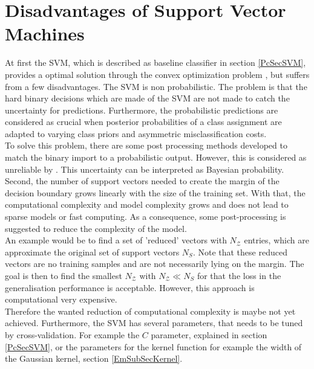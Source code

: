 \section{Disadvantages of Support Vector Machines}\label{PcSecIdea}
At first the \acs{SVM}, which is described as baseline classifier in section \ref{PcSecSVM}, provides a optimal solution through the convex optimization problem \cite[p. 325]{Bishop.2009}, but suffers from a few disadvantages.\newline
The \acs{SVM} is non probabilistic.
The problem is that the hard binary decisions which are made of the \acs{SVM} are not made to catch the uncertainty for predictions.
Furthermore, the probabilistic predictions are considered as crucial when posterior probabilities of a class assignment are adapted to varying class priors and asymmetric misclassification costs.\cite[p. 239-240]{Tipping.2001}\\
To solve this problem, there are some post processing methods developed to match the binary import to a probabilistic output.
However, this is considered as unreliable by \cite[p. 239-240]{Tipping.2001}. 
This uncertainty can be interpreted as Bayesian probability.\cite[p. 21]{Bishop.2009}\newline 
Second, the number of support vectors needed to create the margin of the decision boundary grows linearly with the size of the training set.
With that, the computational complexity and model complexity grows and does not lead to sparse models or fast computing.
As a consequence, some post-processing is suggested to reduce the complexity of the model.\cite{Chen.2009}\\
An example would be to find a set of 'reduced' vectors with $N_\mathcal{Z}$ entries, which are approximate the original set of support vectors $N_S$.
Note that these reduced vectors are no training samples and are not necessarily lying on the margin.
The goal is then to find the smallest $N_\mathcal{Z}$ with $N_\mathcal{Z} \ll N_S$ for that the loss in the generalisation performance is acceptable.
However, this approach is computational very expensive.\cite{Burges.1997}\\
Therefore the wanted reduction of computational complexity is maybe not yet achieved.\newline
Furthermore, the \ac{SVM} has several parameters, that needs to be tuned by cross-validation.
For example the $C$ parameter, explained in section \ref{PcSecSVM}, or the parameters for the kernel function for example the width of the Gaussian kernel, section \ref{EmSubSecKernel}.
